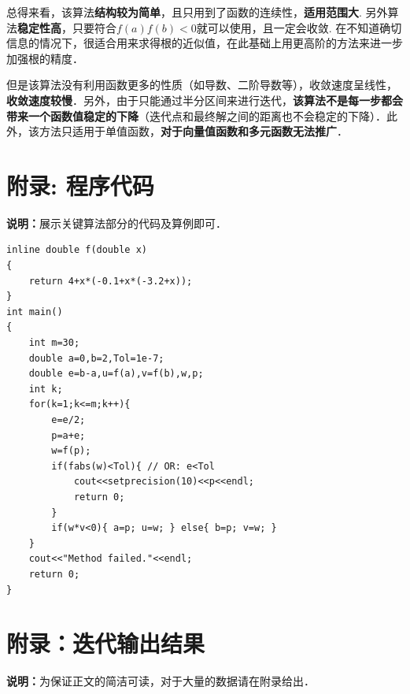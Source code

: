 \documentclass[UTF8,ctexart,a4paper,11pt,openany]{article}
\theoremstyle{definition}
\begin{document}
总得来看，该算法\textbf{结构较为简单}，且只用到了函数的连续性，\textbf{适用范围大}. 另外算法\textbf{稳定性高}，只要符合$f(a)f(b) < 0$就可以使用，且一定会收敛. 在不知道确切信息的情况下，很适合用来求得根的近似值，在此基础上用更高阶的方法来进一步加强根的精度．

但是该算法没有利用函数更多的性质（如导数、二阶导数等），收敛速度呈线性，\textbf{收敛速度较慢}．另外，由于只能通过半分区间来进行迭代，\textbf{该算法不是每一步都会带来一个函数值稳定的下降}（迭代点和最终解之间的距离也不会稳定的下降）．此外，该方法只适用于单值函数，\textbf{对于向量值函数和多元函数无法推广}．

\clearpage

\section{附录: 程序代码}

\textbf{说明：}展示关键算法部分的代码及算例即可．


\begin{lstlisting}[aboveskip=0pt]
inline double f(double x)
{
    return 4+x*(-0.1+x*(-3.2+x));
}
int main()
{
    int m=30;
    double a=0,b=2,Tol=1e-7;
    double e=b-a,u=f(a),v=f(b),w,p;
    int k;
    for(k=1;k<=m;k++){
        e=e/2;
        p=a+e;
        w=f(p);
        if(fabs(w)<Tol){ // OR: e<Tol
            cout<<setprecision(10)<<p<<endl;
            return 0;
        }
        if(w*v<0){ a=p; u=w; } else{ b=p; v=w; }
    }
    cout<<"Method failed."<<endl;
    return 0;
}
\end{lstlisting}

\clearpage

\section{附录：迭代输出结果}

\textbf{说明：}为保证正文的简洁可读，对于大量的数据请在附录给出．
\end{document}
